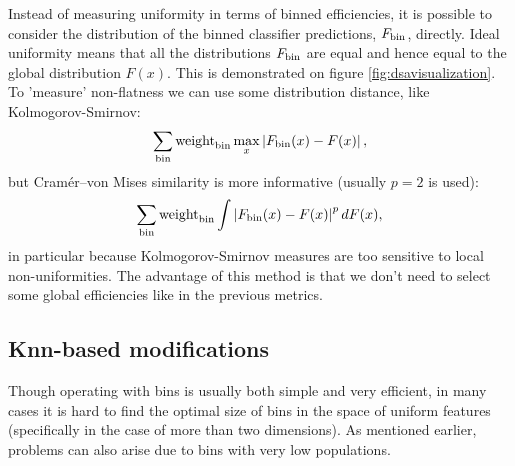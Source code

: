 Instead of measuring uniformity in terms of binned efficiencies, it is possible to consider the distribution of
the binned classifier predictions, $F_{\text{bin}}$, directly.
Ideal uniformity means that all the distributions $F_{\text{bin}}$ are equal and hence equal to the global distribution $F(x)$. 
This is demonstrated on figure \ref{fig:dsavisualization}.
To 'measure' non-flatness we can use some distribution distance, like Kolmogorov-Smirnov:
\[
	 \sum_{\text{bin}} \text{weight}_\text{bin} \max_x \left\vert F_{\text{bin}}(x) - F(x)\right\vert,
\]
but Cram\'er--von Mises similarity is more informative (usually $p=2$ is used):
\[
	 \sum_{\text{bin}} \text{weight}_\text{bin} \int \left\vert F_{\text{bin}}(x) - F(x)\right\vert^p dF(x),
\]
in particular because Kolmogorov-Smirnov measures are too sensitive to local non-uniformities.
The advantage of this method is that we don't need to select some global efficiencies like in the previous metrics.
%
%

\subsection*{Knn-based modifications}

\def\knni{\text{knn}(i)}
\def\effknni{\text{eff}_{\knni}}
\def\weightknni{\text{weight}_{\knni}}
\def\Fknn{F_{\knni}}

\def\knnSDE{\text{knnSDE}}
\newcommand*\mean[1]{\overline{#1}}


Though operating with bins is usually both simple and very efficient, 
in many cases it is hard to find the optimal size of bins in the space of uniform features (specifically in the case of more than two dimensions).
As mentioned earlier, problems can also arise due to bins with very low populations.

